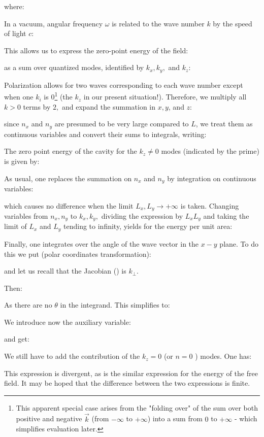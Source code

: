 	where:
	
	In a vacuum, angular frequency $\omega$ is related to the wave number $k$ by the speed of light $c$:
	
	This allows us to express the zero-point energy of the field:
	
	as a sum over quantized modes, identified by $k_{x}, k_{y},$ and $k_{z}$:
	
	Polarization allows for two waves corresponding to each wave number except when one $k_{i}$ is $0$\footnote{This apparent special case arises from the "folding over" of the sum over both positive and negative $\vec{k}$ (from $-\infty$ to $+\infty$) into a sum from $0$ to $+\infty$ - which simplifies evaluation later.} (the $k_z$ in our present situation!). Therefore, we multiply all $k>0$ terms by $2,$ and expand the summation in $x, y$, and $z$:
	
	since $n_x$ and $n_y$ are presumed to be very large compared to $L$, we treat them as continuous variables and convert their sums to integrals, writing:
	
	The zero point energy of the cavity for the $k_{z} \neq 0$ modes (indicated by the prime) is given by:
	
	As usual, one replaces the summation on $n_{x}$ and $n_{y}$ by integration on continuous variables:
	
	which causes no difference when the limit $L_{x}, L_{y} \rightarrow +\infty$ is taken. Changing variables from $n_{x}, n_{y}$ to $k_{x}, k_{y},$ dividing the expression by $L_{x} L_{y}$ and taking the limit of $L_{x}$ and $L_{y}$ tending to infinity, yields for the energy per unit area:
	
	Finally, one integrates over the angle of the wave vector in the $x-y$ plane. To do this we put (polar coordinates transformation):
	
	and let us recall that the Jacobian () is $k_{\perp}$. 
	
	Then:
	
	As there are no $\theta$ in the integrand. This simplifies to:
	
	
	We introduce now the auxiliary variable:
	
	and get:
	
	We still have to add the contribution of the $k_{z}=0$ (or $n=0$ ) modes. One has:
	
	This expression is divergent, as is the similar expression for the energy of the free field. It may be hoped that the difference between the two expressions is finite.
	
